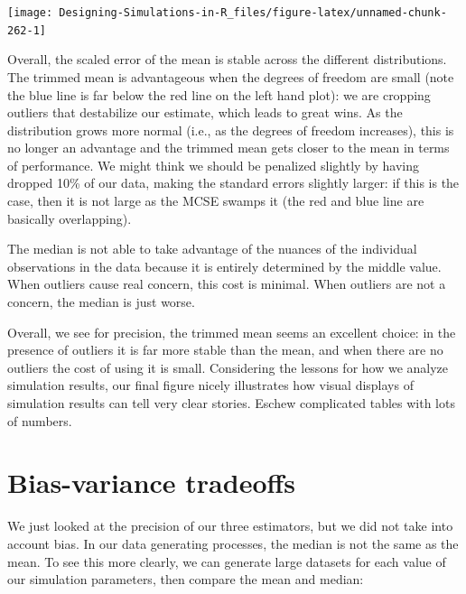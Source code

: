 \documentclass[
]{book}
\begin{document}
\begin{center}\texttt{[image: Designing-Simulations-in-R\_files/figure-latex/unnamed-chunk-262-1]} \end{center}

Overall, the scaled error of the mean is stable across the different distributions.
The trimmed mean is advantageous when the degrees of freedom are small (note the blue line is far below the red line on the left hand plot): we are cropping outliers that destabilize our estimate, which leads to great wins.
As the distribution grows more normal (i.e., as the degrees of freedom increases), this is no longer an advantage and the trimmed mean gets closer to the mean in terms of
performance.
We might think we should be penalized slightly by having dropped 10\% of our data, making the standard errors slightly larger: if this is the case, then it is not large as the MCSE swamps it (the red and blue line are basically overlapping).

The median is not able to take advantage of the nuances of the individual observations in the data because it is entirely determined by the middle value.
When outliers cause real concern, this cost is minimal. When outliers are not a concern, the median is just worse.

Overall, we see for precision, the trimmed mean seems an excellent choice: in the presence of
outliers it is far more stable than the mean, and when there are no outliers
the cost of using it is small.
Considering the lessons for how we analyze simulation results, our final figure nicely illustrates how
visual displays of simulation results can tell very clear stories.
Eschew complicated tables with lots of numbers.

\section{Bias-variance tradeoffs}\label{bias-variance-tradeoffs}

We just looked at the precision of our three estimators, but we did not take into account bias.
In our data generating processes, the median is not the same as the mean.
To see this more clearly, we can generate large datasets for each value of our simulation parameters, then compare the mean and median:
\end{document}
